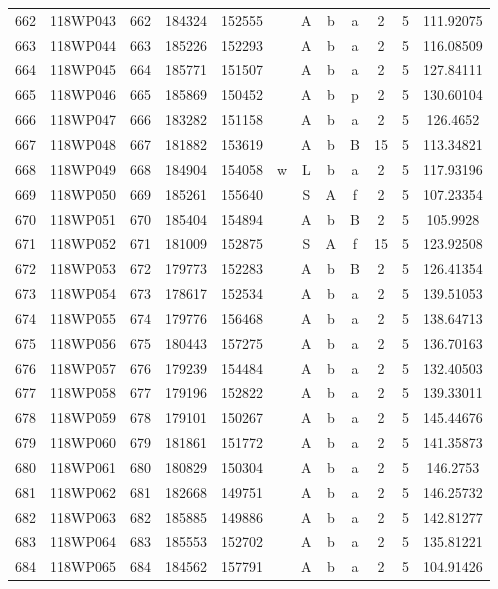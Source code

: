 \begin{tabular}{|*{12}{c|}}
662 & 118WP043 & 662 & 184324 & 152555 &  & A & b & a & 2 & 5 & 111.92075 \\ 
663 & 118WP044 & 663 & 185226 & 152293 &  & A & b & a & 2 & 5 & 116.08509 \\ 
664 & 118WP045 & 664 & 185771 & 151507 &  & A & b & a & 2 & 5 & 127.84111 \\ 
665 & 118WP046 & 665 & 185869 & 150452 &  & A & b & p & 2 & 5 & 130.60104 \\ 
666 & 118WP047 & 666 & 183282 & 151158 &  & A & b & a & 2 & 5 & 126.4652 \\ 
667 & 118WP048 & 667 & 181882 & 153619 &  & A & b & B & 15 & 5 & 113.34821 \\ 
668 & 118WP049 & 668 & 184904 & 154058 & w & L & b & a & 2 & 5 & 117.93196 \\ 
669 & 118WP050 & 669 & 185261 & 155640 &  & S & A & f & 2 & 5 & 107.23354 \\ 
670 & 118WP051 & 670 & 185404 & 154894 &  & A & b & B & 2 & 5 & 105.9928 \\ 
671 & 118WP052 & 671 & 181009 & 152875 &  & S & A & f & 15 & 5 & 123.92508 \\ 
672 & 118WP053 & 672 & 179773 & 152283 &  & A & b & B & 2 & 5 & 126.41354 \\ 
673 & 118WP054 & 673 & 178617 & 152534 &  & A & b & a & 2 & 5 & 139.51053 \\ 
674 & 118WP055 & 674 & 179776 & 156468 &  & A & b & a & 2 & 5 & 138.64713 \\ 
675 & 118WP056 & 675 & 180443 & 157275 &  & A & b & a & 2 & 5 & 136.70163 \\ 
676 & 118WP057 & 676 & 179239 & 154484 &  & A & b & a & 2 & 5 & 132.40503 \\ 
677 & 118WP058 & 677 & 179196 & 152822 &  & A & b & a & 2 & 5 & 139.33011 \\ 
678 & 118WP059 & 678 & 179101 & 150267 &  & A & b & a & 2 & 5 & 145.44676 \\ 
679 & 118WP060 & 679 & 181861 & 151772 &  & A & b & a & 2 & 5 & 141.35873 \\ 
680 & 118WP061 & 680 & 180829 & 150304 &  & A & b & a & 2 & 5 & 146.2753 \\ 
681 & 118WP062 & 681 & 182668 & 149751 &  & A & b & a & 2 & 5 & 146.25732 \\ 
682 & 118WP063 & 682 & 185885 & 149886 &  & A & b & a & 2 & 5 & 142.81277 \\ 
683 & 118WP064 & 683 & 185553 & 152702 &  & A & b & a & 2 & 5 & 135.81221 \\ 
684 & 118WP065 & 684 & 184562 & 157791 &  & A & b & a & 2 & 5 & 104.91426 \\ 

\end{tabular}
